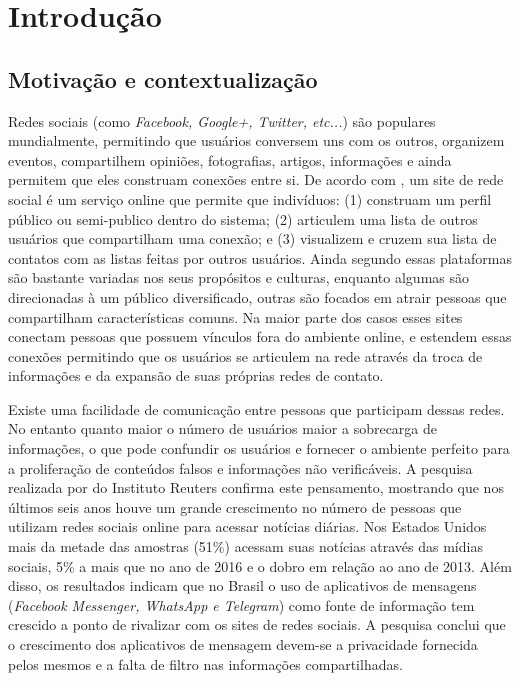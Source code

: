 

\chapter{Introdução}


\section{Motivação e contextualização}

Redes sociais (como \emph{Facebook, Google+, Twitter, etc...}) são populares mundialmente, permitindo que usuários conversem uns com os outros, organizem eventos, compartilhem opiniões, fotografias, artigos, informações e ainda permitem que eles construam conexões entre si. De acordo com \cite{boyd_social_2007}, um site de rede social é um serviço online que permite que indivíduos: (1) construam um perfil público ou semi-publico dentro do sistema; (2) articulem uma lista de outros usuários que compartilham uma conexão; e (3) visualizem e cruzem sua lista de contatos com as listas feitas por outros usuários. Ainda segundo \cite{boyd_social_2007} essas plataformas são bastante variadas nos seus propósitos e culturas, enquanto algumas são direcionadas à um público diversificado, outras são focados em atrair pessoas que compartilham características comuns. Na maior parte dos casos esses sites conectam pessoas que possuem vínculos fora do ambiente online, e estendem essas conexões permitindo que os usuários se articulem na rede através da troca de informações e da expansão de suas próprias redes de contato.

Existe uma facilidade de comunicação entre pessoas que participam dessas redes. No entanto quanto maior o número de usuários maior a sobrecarga de informações, o que pode confundir os usuários e fornecer o ambiente perfeito para a proliferação de conteúdos falsos e informações não verificáveis. A pesquisa realizada por \cite{nic_newman_digital_2017} do Instituto Reuters confirma este pensamento, mostrando que nos últimos seis anos houve um grande crescimento no número de pessoas que utilizam redes sociais online para acessar notícias diárias. Nos Estados Unidos mais da metade das amostras (51\%) acessam suas notícias através das mídias sociais, 5\% a mais que no ano de 2016 e o dobro em relação ao ano de 2013. Além disso, os resultados indicam que no Brasil o uso de aplicativos de mensagens (\emph{Facebook Messenger, WhatsApp e Telegram}) como fonte de informação tem crescido a ponto de rivalizar com os sites de redes sociais. A pesquisa conclui que o crescimento dos aplicativos de mensagem devem-se a privacidade fornecida pelos mesmos e a falta de filtro nas informações compartilhadas.


